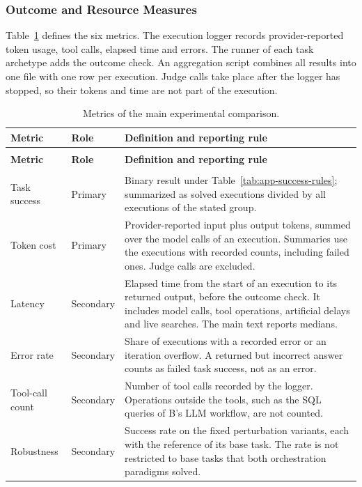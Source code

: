 \subsubsection{Outcome and Resource Measures}
\label{app:protocol/metrics}

Table~\ref{tab:app-metrics} defines the six metrics. The execution logger records provider-reported token usage, tool calls, elapsed time and errors. The runner of each task archetype adds the outcome check. An aggregation script combines all results into one file with one row per execution. Judge calls take place after the logger has stopped, so their tokens and time are not part of the execution.

\begingroup
\renewcommand{\baselinestretch}{1}
\small
\setlength{\tabcolsep}{4pt}
\renewcommand{\arraystretch}{1.08}
\begin{longtable}{>{\raggedright\arraybackslash}p{} >{\raggedright\arraybackslash}p{} >{\raggedright\arraybackslash}p{}}
\caption[Metrics of the main experimental comparison]{Metrics of the main experimental comparison.}\label{tab:app-metrics} \\
\toprule
\textbf{Metric} & \textbf{Role} & \textbf{Definition and reporting rule} \\
\midrule
\endfirsthead
\multicolumn{3}{l}{\tablename~\thetable{} (continued)} \\
\toprule
\textbf{Metric} & \textbf{Role} & \textbf{Definition and reporting rule} \\
\midrule
\endhead
\midrule
\multicolumn{3}{r}{\emph{Continued on the next page.}} \\
\endfoot
\bottomrule
\endlastfoot
Task success & Primary & Binary result under Table~\ref{tab:app-success-rules}; summarized as solved executions divided by all executions of the stated group. \\
\addlinespace[2.5pt]
Token cost & Primary & Provider-reported input plus output tokens, summed over the model calls of an execution. Summaries use the executions with recorded counts, including failed ones. Judge calls are excluded. \\
\addlinespace[2.5pt]
Latency & Secondary & Elapsed time from the start of an execution to its returned output, before the outcome check. It includes model calls, tool operations, artificial delays and live searches. The main text reports medians. \\
\addlinespace[2.5pt]
Error rate & Secondary & Share of executions with a recorded error or an iteration overflow. A returned but incorrect answer counts as failed task success, not as an error. \\
\addlinespace[2.5pt]
Tool-call count & Secondary & Number of tool calls recorded by the logger. Operations outside the tools, such as the SQL queries of B's LLM workflow, are not counted. \\
\addlinespace[2.5pt]
Robustness & Secondary & Success rate on the fixed perturbation variants, each with the reference of its base task. The rate is not restricted to base tasks that both orchestration paradigms solved. \\
\end{longtable}
